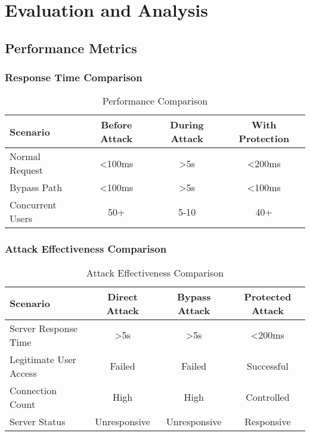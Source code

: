 \documentclass[12pt]{article}
\begin{document}
\section{Evaluation and Analysis}

\subsection{Performance Metrics}

\subsubsection{Response Time Comparison}
\begin{table}[H]
\centering
\begin{tabular}{|l|c|c|c|}
\hline
\textbf{Scenario} & \textbf{Before Attack} & \textbf{During Attack} & \textbf{With Protection} \\
\hline
Normal Request & <100ms & >5s & <200ms \\
\hline
Bypass Path & <100ms & >5s & <100ms \\
\hline
Concurrent Users & 50+ & 5-10 & 40+ \\
\hline
\end{tabular}
\caption{Performance Comparison}
\label{tab:performance}
\end{table}

\subsubsection{Attack Effectiveness Comparison}
\begin{table}[H]
\centering
\begin{tabular}{|l|c|c|c|}
\hline
\textbf{Scenario} & \textbf{Direct Attack} & \textbf{Bypass Attack} & \textbf{Protected Attack} \\
\hline
Server Response Time & >5s & >5s & <200ms \\
\hline
Legitimate User Access & Failed & Failed & Successful \\
\hline
Connection Count & High & High & Controlled \\
\hline
Server Status & Unresponsive & Unresponsive & Responsive \\
\hline
\end{tabular}
\caption{Attack Effectiveness Comparison}
\label{tab:attack_comparison}
\end{table}
\end{document}
